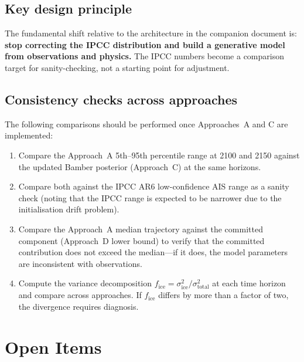 \documentclass[11pt]{article}
\begin{document}
\subsection{Key design principle}

The fundamental shift relative to the architecture in the companion document is: \textbf{stop correcting the IPCC distribution and build a generative model from observations and physics.}  The IPCC numbers become a comparison target for sanity-checking, not a starting point for adjustment.

\subsection{Consistency checks across approaches}

The following comparisons should be performed once Approaches~A and C are implemented:

\begin{enumerate}
  \item Compare the Approach~A 5th--95th percentile range at 2100 and 2150 against the updated Bamber posterior (Approach~C) at the same horizons.

  \item Compare both against the IPCC AR6 low-confidence AIS range as a sanity check (noting that the IPCC range is expected to be narrower due to the initialisation drift problem).

  \item Compare the Approach~A median trajectory against the committed component (Approach~D lower bound) to verify that the committed contribution does not exceed the median---if it does, the model parameters are inconsistent with observations.

  \item Compute the variance decomposition $f_{\text{ice}} = \sigma^2_{\text{ice}} / \sigma^2_{\text{total}}$ at each time horizon and compare across approaches.  If $f_{\text{ice}}$ differs by more than a factor of two, the divergence requires diagnosis.
\end{enumerate}


\section{Open Items}
\label{sec:open_items}
\end{document}
